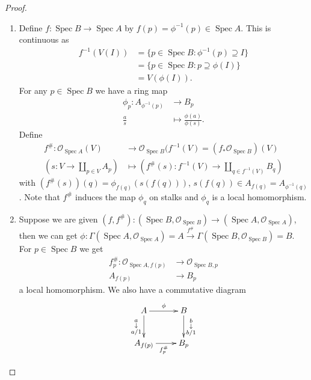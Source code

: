\documentclass[10pt,]{book}
\theoremstyle{plain}
\theoremstyle{definition}
\numberwithin{equation}{section}
\newcommand{\sO}{\mathcal{O}}
\DeclareMathOperator{\Spec}{Spec}
\begin{document}
\begin{proof}
\begin{enumerate}
\item{}
                Define \(f\colon \Spec B \to \Spec A\) by \(f(p) = \phi^{-1}(p) \in \Spec A\).
                This is continuous as
                \begin{align*}
f^{-1}(V(I)) &= \{p\in \Spec B : \phi^{-1}(p) \supseteq I\}\\
             &= \{p\in \Spec B : p \supseteq \phi(I)\}\\
             &= V(\phi(I)).
\end{align*}
                For any \(p\in \Spec B\) we have a ring map 
                \begin{align*}
\phi_p \colon A_{\phi^{-1} (p)} &\to B_p\\
\frac as &\mapsto \frac{\phi(a)}{\phi(s)}.
\end{align*}
                Define
                \begin{align*}
f^\# \colon \sO_{\Spec A}(V) &\to \sO_{\Spec B}(f^{-1}(V) = (f_*\sO_{\Spec B})(V)\\
\left(s\colon V \to \coprod_{p\in V}A_p\right)&\mapsto \left(f^\#(s)\colon f^{-1}(V) \to \coprod_{q\in f^{-1} (V)}B_q\right)
\end{align*}
                with \((f^\#(s))(q) = \phi_{f(q)}(s(f(q)))\), \(s(f(q)) \in A_{f(q)} = A_{\phi^{-1}(q)}\).
                Note that \(f^\#\) induces the map \(\phi_q\) on stalks and \(\phi_q\) is a local homomorphism.
              \item{}
                Suppose we are given \((f, f^\#)\colon (\Spec B, \sO_{\Spec B}) \to (\Spec A, \sO_{\Spec A})\), then we can get \(\phi\colon \Gamma(\Spec A, \sO_{\Spec A}) = A \xrightarrow{f^\#} \Gamma(\Spec B, \sO_{\Spec B}) = B\).
                For \(p\in \Spec B\) we get
                \begin{align*}
f^\#_p \colon \sO_{\Spec A, f(p)} & \to \sO_{\Spec B, p}\\
A_{f(p)} &\to B_p
\end{align*}
                a local homomorphism.
                We also have a commutative diagram
                \[
                  \xymatrix{
                  A \ar[r]^{\phi} \ar[d]_{\substack{a\\\downarrow\\a/1}}& B \ar[d]^{\substack{b\\\downarrow \\b/1}}\\
                  A_{f(p)} \ar[r]_{f_p^\#} & B_p
                  }
                \]
              \end{enumerate}
\end{proof}
\typeout{************************************************}
\typeout{************************************************}
\end{document}
